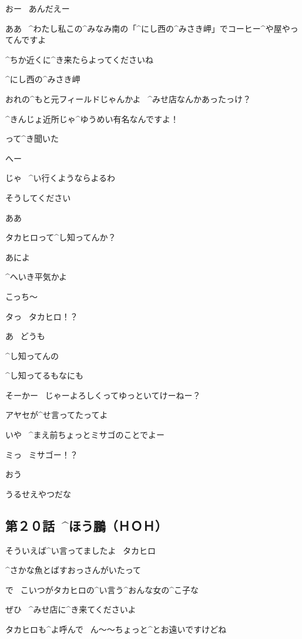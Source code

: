 \Ayase おー
\ あんだえー

\Alpha ああ
\ ^{わたし}{私}この^{みなみ}{南}の「^{にし}{西}の^{みさき}{岬}」でコーヒー^{や}{屋}やってんですよ

\Alpha ^{ちか}{近}くに^{き}{来}たらよってくださいね

\page[63]
\Ayase ^{にし}{西}の^{みさき}{岬}

\Ayase おれの^{もと}{元}フィールドじゃんかよ
\ ^{みせ}{店}なんかあったっけ？

\Alpha ^{きんじょ}{近所}じゃ^{ゆうめい}{有名}なんですよ！

\Alpha って^{き}{聞}いた

\Ayase へー

\Ayase じゃ
\ ^{い}{行}くようならよるわ

\Alpha そうしてください

\Ayase ああ

\page[64]
\Ayase タカヒロって^{し}{知}ってんか？

\Ayase あによ

\Ayase ^{へいき}{平気}かよ

\Alpha こっち〜

\page[65]
\Alpha タっ
\ タカヒロ！？

\Alpha あ
\ どうも

\Ayase ^{し}{知}ってんの

\Alpha ^{し}{知}ってるもなにも

\Ayase そーかー
\ じゃーよろしくってゆっといてけーねー？

\page[66]
\Ayase アヤセが^{せ}{言}ってたってよ

\Ayase いや
\ ^{まえ}{前}ちょっとミサゴのことでよー

\Alpha ミっ
\ ミサゴー！？

\Ayase おう

\Ayase うるせえやつだな


\subsection{第２０話\ ^{ほう}{鵬}（ＨＯＨ）}


\page[68]
\Alpha そういえば^{い}{言}ってましたよ
\ タカヒロ

\Alpha ^{さかな}{魚}とばすおっさんがいたって

\Ayase で
\ こいつがタカヒロの^{い}{言}う^{おんな}{女}の^{こ}{子}な

\page[69]
\Alpha ぜひ
\ ^{みせ}{店}に^{き}{来}てくださいよ

\Alpha タカヒロも^{よ}{呼}んで
\ ん〜〜ちょっと^{とお}{遠}いですけどね

